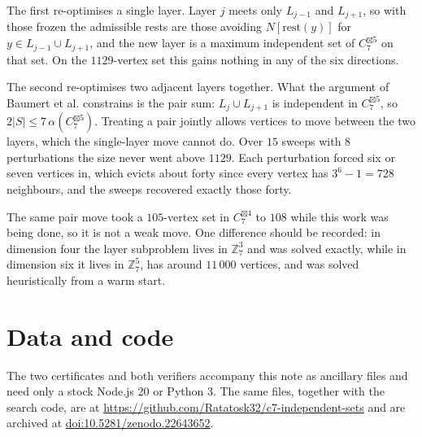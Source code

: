 \documentclass[11pt,a4paper]{article}
\newcommand{\bt}{\boxtimes}
\newcommand{\al}{\alpha}
\begin{document}
The first re-optimises a single layer. Layer $j$ meets only $L_{j-1}$ and $L_{j+1}$, so with
those frozen the admissible rests are those avoiding $N[\mathrm{rest}(y)]$ for
$y \in L_{j-1} \cup L_{j+1}$, and the new layer is a maximum independent set of $C_7^{\bt 5}$
on that set. On the $1129$-vertex set this gains nothing in any of the six directions.

The second re-optimises two adjacent layers together. What the argument of Baumert et al.
\cite{Baumert} constrains is the pair sum: $L_j \cup L_{j+1}$ is independent in $C_7^{\bt 5}$,
so $2|S| \le 7\,\al(C_7^{\bt 5})$. Treating a pair jointly allows vertices to move between the
two layers, which the single-layer move cannot do. Over $15$ sweeps with $8$ perturbations the
size never went above $1129$. Each perturbation forced six or seven vertices in, which evicts
about forty since every vertex has $3^6 - 1 = 728$ neighbours, and the sweeps recovered
exactly those forty.

The same pair move took a $105$-vertex set in $C_7^{\bt 4}$ to $108$ while this work was being
done, so it is not a weak move. One difference should be recorded: in dimension four the layer
subproblem lives in $\mathbb{Z}_7^3$ and was solved exactly, while in dimension six it lives in
$\mathbb{Z}_7^5$, has around $11\,000$ vertices, and was solved heuristically from a warm start.

\section*{Data and code}

The two certificates and both verifiers accompany this note as ancillary files and need only
a stock Node.js 20 or Python 3. The same files, together with the search code, are at
\url{https://github.com/Ratatosk32/c7-independent-sets} and are archived at
\href{https://doi.org/10.5281/zenodo.22643652}{doi:10.5281/zenodo.22643652}.
\end{document}

